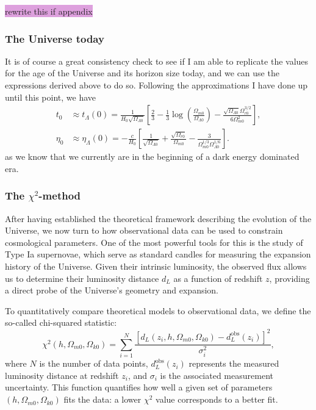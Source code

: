 \documentclass{aa}
\numberwithin{equation}{section}
\numberwithin{table}{section}
\numberwithin{figure}{section}
\begin{document}
\colorbox{Plum}{rewrite this if appendix}


\subsubsection{The Universe today}
It is of course a great consistency check to see if I am able to replicate the values for the age of the Universe and its horizon size today, and we can use the expressions derived above to do so. Following the approximations I have done up until this point, we have
\begin{align}
  t_0 &\approx t_{\Lambda}(0) = \frac{1}{H_0\sqrt{\Omega_{\Lambda0}}}\left[\frac{2}{3}-\frac{1}{3}\log\left(\frac{\Omega_{m0}}{\Omega_{\Lambda0}}\right)-\frac{\sqrt{\Omega_{\Lambda0}}\Omega_{r0}^{3/2}}{6\Omega^2_{m0}}\right],
  \\
  \eta_0 &\approx \eta_\Lambda(0) = -\frac{c}{H_0}\left[\frac{1}{\sqrt{\Omega_{\Lambda0}}} +\frac{\sqrt{\Omega_{r0}}}{\Omega_{m0}} - \frac{3}{\Omega_{m0}^{1/3}\Omega_{\Lambda0}^{1/6}} \right].
\end{align}
as we know that we currently are in the beginning of a dark energy dominated era.


\subsubsection{The \texorpdfstring{$\chi^2$}{Lg}-method}
After having established the theoretical framework describing the evolution of the Universe, we now turn to how observational data can be used to constrain cosmological parameters. One of the most powerful tools for this is the study of Type Ia supernovae, which serve as standard candles for measuring the expansion history of the Universe. Given their intrinsic luminosity, the observed flux allows us to determine their luminosity distance $d_L$ as a function of redshift $z$, providing a direct probe of the Universe's geometry and expansion.

To quantitatively compare theoretical models to observational data, we define the so-called chi-squared statistic:
\begin{equation}
  \chi^2(h, \Omega_{m0}, \Omega_{k0}) = \sum_{i=1}^{N} \frac{ \left[ d_L(z_i, h, \Omega_{m0}, \Omega_{k0}) - d_L^{\text{obs}}(z_i) \right]^2 }{\sigma_i^2},
\end{equation}
where $N$ is the number of data points, $d_L^{\text{obs}}(z_i)$ represents the measured luminosity distance at redshift $z_i$, and $\sigma_i$ is the associated measurement uncertainty. This function quantifies how well a given set of parameters $(h, \Omega_{m0}, \Omega_{k0})$ fits the data: a lower $\chi^2$ value corresponds to a better fit. 
\end{document}
